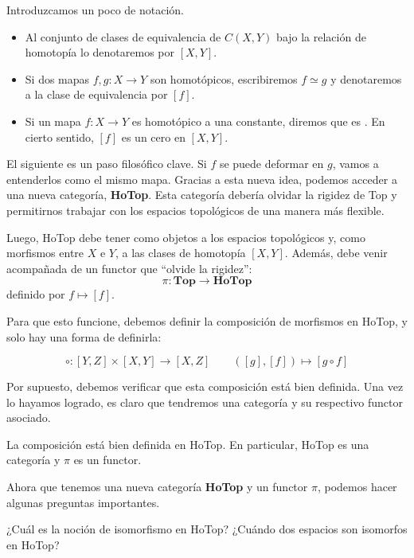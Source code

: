 Introduzcamos un poco de notación. 

\begin{itemize}
    \item Al conjunto de clases de equivalencia de $C(X,Y)$ bajo la relación de homotopía lo denotaremos por $[X,Y]$.
    \item Si dos mapas $f,g\colon X \to Y$ son homotópicos, escribiremos $f \simeq g$ y denotaremos a la clase de equivalencia por $[f]$.
    \item Si un mapa $f\colon X \to Y$ es homotópico a una constante, diremos que es . En cierto sentido, $[f]$ es un cero en $[X,Y]$.
\end{itemize}

El siguiente es un paso filosófico clave. Si $f$ se puede deformar en $g$, vamos a entenderlos como el mismo mapa. Gracias a esta nueva idea, podemos acceder a una nueva categoría, \textbf{HoTop}. Esta categoría debería olvidar la rigidez de Top y permitirnos trabajar con los espacios topológicos de una manera más flexible. 

Luego, HoTop debe tener como objetos a los espacios topológicos y, como morfismos entre $X$ e $Y$, a las clases de homotopía $[X,Y]$. Además, debe venir acompañada de un functor que ``olvide la rigidez'':
\[
    \pi : \mathbf{Top} \to \mathbf{HoTop}
\]
definido por $f \mapsto [f]$.

Para que esto funcione, debemos definir la composición de morfismos en HoTop, y solo hay una forma de definirla:

\[
      \circ : [Y,Z] \times [X,Y] \to [X,Z] \qquad ([g],[f]) \mapsto [g \circ f]
\]

Por supuesto, debemos verificar que esta composición está bien definida. Una vez lo hayamos logrado, es claro que tendremos una categoría y su respectivo functor asociado.

\begin{proposicion}
    La composición está bien definida en HoTop. En particular, HoTop es una categoría y $\pi$ es un functor.
\end{proposicion}

Ahora que tenemos una nueva categoría \textbf{HoTop} y un functor $\pi$, podemos hacer algunas preguntas importantes.

\begin{pregunta*}
    ¿Cuál es la noción de isomorfismo en HoTop? ¿Cuándo dos espacios son isomorfos en HoTop?
\end{pregunta*}

